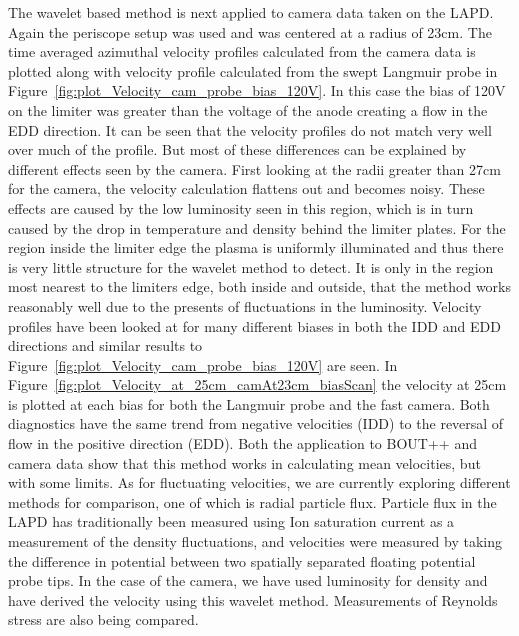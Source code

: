 \documentclass{jpp}
\begin{document}
The wavelet based method is next applied to camera data taken on the LAPD. Again the periscope setup was used and was centered at a radius of 23cm. The time averaged azimuthal velocity profiles calculated from the camera data is plotted along with velocity profile calculated from the swept Langmuir probe in Figure~\ref{fig:plot_Velocity_cam_probe_bias_120V}. In this case the bias of 120V on the limiter was greater than the voltage of the anode creating a flow in the EDD direction.  It can be seen that the velocity profiles do not match very well over much of the profile.  But most of these differences can be explained by different effects seen by the camera.  First looking at the radii greater than 27cm for the camera, the velocity calculation flattens out and becomes noisy.  These effects are caused by the low luminosity seen in this region, which is in turn caused by the drop in temperature and density behind the limiter plates.  For the region inside the limiter edge the plasma is uniformly illuminated and thus there is very little structure for the wavelet method to detect.  It is only in the region most nearest to the limiters edge, both inside and outside, that the method works reasonably well due to the presents of fluctuations in the luminosity.   Velocity profiles have been looked at for many different biases in both the IDD and EDD directions and similar results to Figure~\ref{fig:plot_Velocity_cam_probe_bias_120V} are seen. In Figure~\ref{fig:plot_Velocity_at_25cm_camAt23cm_biasScan} the  velocity at 25cm is plotted at each bias for both the Langmuir probe and the fast camera.  Both diagnostics have the same trend from negative velocities (IDD) to the reversal of flow in the positive direction (EDD). Both the application to BOUT++ and camera data show that this method works in calculating mean velocities, but with some limits.  As for fluctuating velocities, we are currently exploring different methods for comparison, one of which is radial particle flux. Particle flux in the LAPD has traditionally been measured using Ion saturation current as a measurement of the density fluctuations, and velocities were measured by taking the difference in potential between two spatially separated floating potential probe tips. In the case of the camera, we have used luminosity for density and have derived the velocity using this wavelet method.  Measurements of Reynolds stress are also being compared. 
\end{document}
